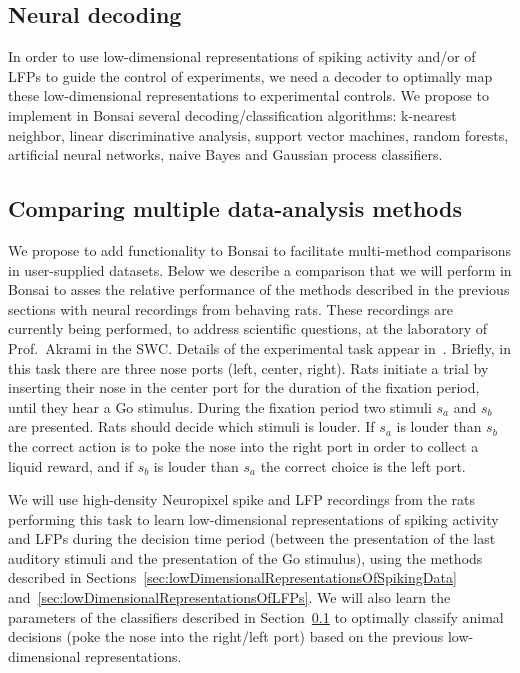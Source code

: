 \documentclass[a4paper,11point]{article}
\begin{document}
\subsection{Neural decoding}
\label{sec:neuralDecoding}

In order to use low-dimensional representations of spiking activity and/or of
LFPs to guide the control of experiments, we need a decoder to optimally map
these low-dimensional representations to experimental controls.
%
We propose to implement in Bonsai several decoding/classification algorithms:
k-nearest neighbor, linear discriminative analysis, support vector machines,
random forests, artificial neural networks, naive Bayes and Gaussian process
classifiers.

\subsection{Comparing multiple data-analysis methods}
\label{sec:comparisonOfMultipleMethods}

We propose to add functionality to Bonsai to facilitate multi-method
comparisons in user-supplied datasets. Below we describe a comparison that we
will perform in Bonsai to asses the relative performance of the methods
described in the previous sections with neural recordings from behaving rats.
These recordings are currently being performed, to address scientific questions,
at the laboratory of Prof.~Akrami in the SWC.
%
Details of the experimental task appear in~\citet{akramiEtAl18}.
%
Briefly, in this task there are three nose ports (left, center, right). Rats
initiate a trial by inserting their nose in the center port for the duration of
the fixation period, until they hear a Go stimulus. During the fixation period
two stimuli $s_a$ and $s_b$ are presented. Rats should decide which stimuli is
louder. If $s_a$ is louder than $s_b$ the correct action is to poke the nose
into the right port in order to collect a liquid reward, and if $s_b$ is louder
than $s_a$ the correct choice is the left port.

We will use high-density Neuropixel spike and LFP recordings from the rats
performing this task to learn low-dimensional representations of spiking
activity and LFPs during the decision time period (between the presentation of
the last auditory stimuli and the presentation of the Go stimulus), using the
methods described in
Sections~\ref{sec:lowDimensionalRepresentationsOfSpikingData}
and~\ref{sec:lowDimensionalRepresentationsOfLFPs}. We will also learn the
parameters of the classifiers described in Section~\ref{sec:neuralDecoding} to
optimally classify animal decisions (poke the nose into the right/left port)
based on the previous low-dimensional representations.
\end{document}
